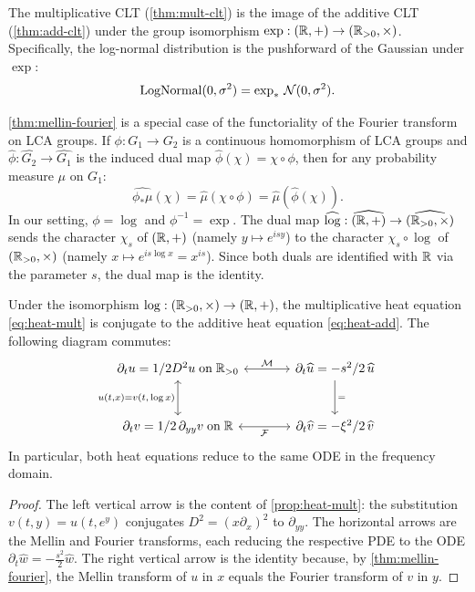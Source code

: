 \begin{corollary}\label{cor:clt-image}
The multiplicative CLT (\cref{thm:mult-clt}) is the image of the additive CLT (\cref{thm:add-clt}) under the group isomorphism $\exp : (\mathbb{R}, +) \to (\mathbb{R}_{>0}, \times)$. Specifically, the log-normal distribution is the pushforward of the Gaussian under $\exp$:
\[
\operatorname{LogNormal}(0, \sigma^2) = \exp_*\, \mathcal{N}(0, \sigma^2).
\]
\end{corollary}

\begin{remark}[Functoriality]\label{rmk:functoriality}
\cref{thm:mellin-fourier} is a special case of the functoriality of the Fourier transform on LCA groups. If $\phi : G_1 \to G_2$ is a continuous homomorphism of LCA groups and $\widehat{\phi} : \widehat{G_2} \to \widehat{G_1}$ is the induced dual map $\widehat{\phi}(\chi) = \chi \circ \phi$, then for any probability measure $\mu$ on $G_1$:
\[
\widehat{\phi_*\mu}(\chi) = \widehat{\mu}(\chi \circ \phi) = \widehat{\mu}\!\left(\widehat{\phi}(\chi)\right).
\]
In our setting, $\phi = \log$ and $\phi^{-1} = \exp$. The dual map $\widehat{\log} : \widehat{(\mathbb{R},+)} \to \widehat{(\mathbb{R}_{>0},\times)}$ sends the character $\chi_s$ of $(\mathbb{R},+)$ (namely $y \mapsto e^{isy}$) to the character $\chi_s \circ \log$ of $(\mathbb{R}_{>0},\times)$ (namely $x \mapsto e^{is\log x} = x^{is}$). Since both duals are identified with $\mathbb{R}$ via the parameter $s$, the dual map is the identity.
\end{remark}

\begin{proposition}\label{prop:heat-duality}
Under the isomorphism $\log : (\mathbb{R}_{>0}, \times) \to (\mathbb{R}, +)$, the multiplicative heat equation \eqref{eq:heat-mult} is conjugate to the additive heat equation \eqref{eq:heat-add}. The following diagram commutes:
\begin{equation}\label{eq:cd-heat}
\begin{tikzcd}[column sep=large, row sep=large]
\partial_t u = \tfrac{1}{2}D^2 u \;\text{on}\; \Rpos \arrow[r, leftrightarrow, "\cM"] \arrow[d, leftrightarrow, "u(t{,}x) {=} v(t{,}\log x)"'] & \partial_t \widehat{u} = -\tfrac{s^2}{2}\,\widehat{u} \arrow[d, "="] \\
\partial_t v = \tfrac{1}{2}\,\partial_{yy} v \;\text{on}\; \R \arrow[r, leftrightarrow, "\cF"'] & \partial_t \widehat{v} = -\tfrac{\xi^2}{2}\,\widehat{v}
\end{tikzcd}
\end{equation}
In particular, both heat equations reduce to the same ODE in the frequency domain.
\end{proposition}

\begin{proof}
The left vertical arrow is the content of \cref{prop:heat-mult}: the substitution $v(t,y) = u(t, e^y)$ conjugates $D^2 = (x\partial_x)^2$ to $\partial_{yy}$. The horizontal arrows are the Mellin and Fourier transforms, each reducing the respective PDE to the ODE $\partial_t \widehat{w} = -\frac{s^2}{2}\widehat{w}$. The right vertical arrow is the identity because, by \cref{thm:mellin-fourier}, the Mellin transform of $u$ in $x$ equals the Fourier transform of $v$ in $y$.
\end{proof}


